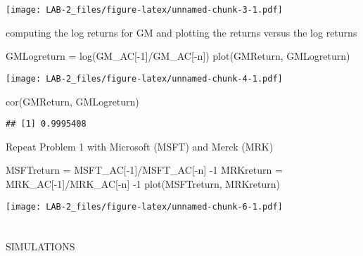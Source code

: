 \documentclass[
]{article}
\newenvironment{Shaded}{\begin{snugshade}}{\end{snugshade}}
\newcommand{\DecValTok}[1]{\textcolor[rgb]{0.00,0.00,0.81}{#1}}
\newcommand{\FunctionTok}[1]{\textcolor[rgb]{0.00,0.00,0.00}{#1}}
\newcommand{\NormalTok}[1]{#1}
\newcommand{\OtherTok}[1]{\textcolor[rgb]{0.56,0.35,0.01}{#1}}
\newcommand{\SpecialCharTok}[1]{\textcolor[rgb]{0.00,0.00,0.00}{#1}}
\begin{document}
\texttt{[image: LAB-2\_files/figure-latex/unnamed-chunk-3-1.pdf]}

computing the log returns for GM and plotting the returns versus the log
returns

\begin{Shaded}
\begin{Highlighting}[]
\NormalTok{GMLogreturn }\OtherTok{=} \FunctionTok{log}\NormalTok{(GM\_AC[}\SpecialCharTok{{-}}\DecValTok{1}\NormalTok{]}\SpecialCharTok{/}\NormalTok{GM\_AC[}\SpecialCharTok{{-}}\NormalTok{n])}
\FunctionTok{plot}\NormalTok{(GMReturn, GMLogreturn)}
\end{Highlighting}
\end{Shaded}

\texttt{[image: LAB-2\_files/figure-latex/unnamed-chunk-4-1.pdf]}

\begin{Shaded}
\begin{Highlighting}[]
\FunctionTok{cor}\NormalTok{(GMReturn, GMLogreturn)}
\end{Highlighting}
\end{Shaded}

\begin{verbatim}
## [1] 0.9995408
\end{verbatim}

Repeat Problem 1 with Microsoft (MSFT) and Merck (MRK)

\begin{Shaded}
\begin{Highlighting}[]
\NormalTok{MSFTreturn }\OtherTok{=}\NormalTok{ MSFT\_AC[}\SpecialCharTok{{-}}\DecValTok{1}\NormalTok{]}\SpecialCharTok{/}\NormalTok{MSFT\_AC[}\SpecialCharTok{{-}}\NormalTok{n] }\SpecialCharTok{{-}}\DecValTok{1}
\NormalTok{MRKreturn }\OtherTok{=}\NormalTok{ MRK\_AC[}\SpecialCharTok{{-}}\DecValTok{1}\NormalTok{]}\SpecialCharTok{/}\NormalTok{MRK\_AC[}\SpecialCharTok{{-}}\NormalTok{n] }\SpecialCharTok{{-}}\DecValTok{1}
\FunctionTok{plot}\NormalTok{(MSFTreturn, MRKreturn)}
\end{Highlighting}
\end{Shaded}

\texttt{[image: LAB-2\_files/figure-latex/unnamed-chunk-6-1.pdf]}

\hypertarget{section}{%
\section{}\label{section}}

SIMULATIONS
\end{document}
